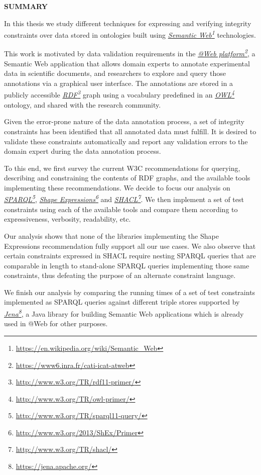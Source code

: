 \documentclass[a4paper, 10pt]{article}
\newcommand{\header}[1]{
  \begin{center}
    \textbf{\uppercase{#1}}
  \end{center}
  \vspace{-1em}
}
\newcommand{\fnhref}[2]{\href{#2}{#1}\footnote{\url{#2}}}
\newcommand{\ifnhref}[2]{\textit{\fnhref{#1}{#2}}}
\begin{document}
\header{Summary}

In this thesis we study different techniques for expressing and verifying
integrity constraints over data stored in ontologies built using
\ifnhref{Semantic Web}{https://en.wikipedia.org/wiki/Semantic\_Web}
technologies.

This work is motivated by data validation requirements in the \ifnhref{@Web
platform}{https://www6.inra.fr/cati-icat-atweb}, a Semantic Web application
that allows domain experts to annotate experimental data in scientific
documents, and researchers to explore and query those annotations via a
graphical user interface. The annotations are stored in a publicly accessible
\ifnhref{RDF}{http://www.w3.org/TR/rdf11-primer/} graph using a vocabulary
predefined in an \ifnhref{OWL}{http://www.w3.org/TR/owl-primer/} ontology, and
shared with the research community.

Given the error-prone nature of the data annotation process, a set of integrity
constraints has been identified that all annotated data must fulfill. It is
desired to validate these constraints automatically and report any validation
errors to the domain expert during the data annotation process.

To this end, we first survey the current W3C recommendations for querying,
describing and constraining the contents of RDF graphs, and the available tools
implementing these recommendations. We decide to focus our analysis on
\ifnhref{SPARQL}{http://www.w3.org/TR/sparql11-query/}, \ifnhref{Shape
Expressions}{http://www.w3.org/2013/ShEx/Primer} and
\ifnhref{SHACL}{http://www.w3.org/TR/shacl/}. We then implement a set of test
constraints using each of the available tools and compare them according to
expressiveness, verbosity, readability, etc.

Our analysis shows that none of the libraries implementing the Shape
Expressions recommendation fully support all our use cases. We also observe
that certain constraints expressed in SHACL require nesting SPARQL queries that
are comparable in length to stand-alone SPARQL queries implementing those same
constraints, thus defeating the purpose of an alternate constraint language.

We finish our analysis by comparing the running times of a set of test
constraints implemented as SPARQL queries against different triple stores
supported by \ifnhref{Jena}{https://jena.apache.org/}, a Java library for
building Semantic Web applications which is already used in @Web for other
purposes.
\end{document}
